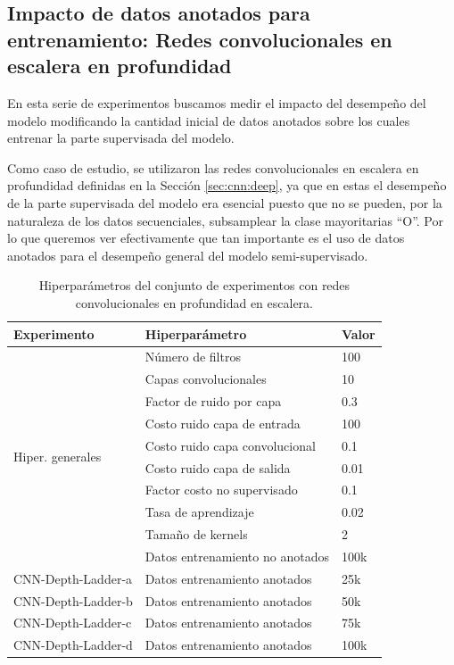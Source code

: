 \subsection{Impacto de datos anotados para entrenamiento: Redes convolucionales
en escalera en profundidad}

En esta serie de experimentos buscamos medir el impacto del desempeño del modelo modificando la cantidad
inicial de datos anotados sobre los cuales entrenar la parte supervisada del modelo. 

Como caso de estudio, se utilizaron las redes convolucionales en escalera en profundidad definidas en la 
Sección \ref{sec:cnn:deep}, ya que en estas el desempeño de la parte supervisada del modelo era esencial 
puesto que no se pueden, por la naturaleza de los datos secuenciales, subsamplear la clase mayoritarias ``O''.
Por lo que queremos ver efectivamente que tan importante es el uso de datos anotados para el desempeño general
del modelo semi-supervisado.

\begin{table}[b!]
    \centering
    \begin{tabular}{|l|l|l|}
        \hline
        \textbf{Experimento} & \textbf{Hiperparámetro} & \textbf{Valor} \\
        \hline
        \multirow{10}{*}{Hiper. generales} & Número de filtros & 100 \\
                              & Capas convolucionales & 10 \\
                              & Factor de ruido por capa & 0.3 \\
                              & Costo ruido capa de entrada & 100 \\
                              & Costo ruido capa convolucional & 0.1 \\
                              & Costo ruido capa de salida & 0.01 \\
                              & Factor costo no supervisado & 0.1 \\
                              & Tasa de aprendizaje & 0.02 \\
                              & Tamaño de kernels & 2 \\
                              & Datos entrenamiento no anotados & 100k \\
                              
        \hline
        \multirow{1}{*}{CNN-Depth-Ladder-a} & Datos entrenamiento anotados & 25k \\
        \hline
        \multirow{1}{*}{CNN-Depth-Ladder-b} & Datos entrenamiento anotados & 50k \\
        \hline
        \multirow{1}{*}{CNN-Depth-Ladder-c} & Datos entrenamiento anotados & 75k \\
        \hline
        \multirow{1}{*}{CNN-Depth-Ladder-d} & Datos entrenamiento anotados & 100k \\
        \hline
    \end{tabular}
    \caption{Hiperparámetros del conjunto de experimentos con redes convolucionales en profundidad en escalera.}
    \label{tab:exp:cnn_depth_ladder}
\end{table}

